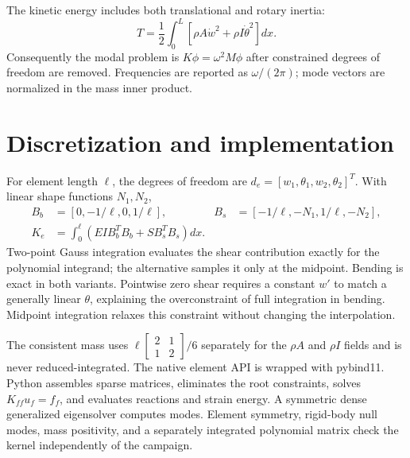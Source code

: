 \documentclass[10pt,a4paper]{article}
\begin{document}
The kinetic energy includes both translational and rotary inertia:
\begin{equation}
T=\frac12\int_0^L\left[\rho A\dot w^2+\rho I\dot\theta^2\right]dx.
\end{equation}
Consequently the modal problem is $K\phi=\omega^2M\phi$ after constrained degrees of freedom are removed. Frequencies are reported as $\omega/(2\pi)$; mode vectors are normalized in the mass inner product.
\newpage
\section{Discretization and implementation}
For element length $\ell$, the degrees of freedom are $d_e=[w_1,\theta_1,w_2,\theta_2]^T$. With linear shape functions $N_1,N_2$,
\begin{align}
B_b&=[0,-1/\ell,0,1/\ell],& B_s&=[-1/\ell,-N_1,1/\ell,-N_2],\\
K_e&=\int_0^\ell\left(EI B_b^TB_b+S B_s^TB_s\right)dx.
\end{align}
Two-point Gauss integration evaluates the shear contribution exactly for the polynomial integrand; the alternative samples it only at the midpoint. Bending is exact in both variants. Pointwise zero shear requires a constant $w'$ to match a generally linear $\theta$, explaining the overconstraint of full integration in bending. Midpoint integration relaxes this constraint without changing the interpolation.

The consistent mass uses $\ell[\begin{smallmatrix}2&1\\1&2\end{smallmatrix}]/6$ separately for the $\rho A$ and $\rho I$ fields and is never reduced-integrated. The native element API is wrapped with pybind11. Python assembles sparse matrices, eliminates the root constraints, solves $K_{ff}u_f=f_f$, and evaluates reactions and strain energy. A symmetric dense generalized eigensolver computes modes. Element symmetry, rigid-body null modes, mass positivity, and a separately integrated polynomial matrix check the kernel independently of the campaign.
\end{document}
